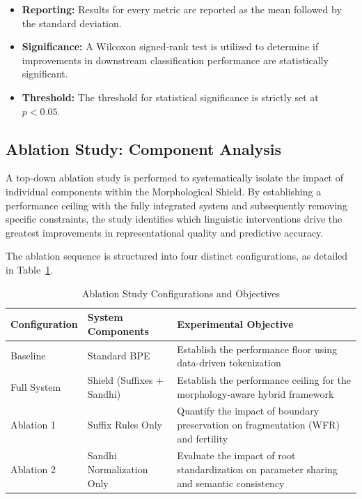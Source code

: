\documentclass[12pt]{article}
\begin{document}
\begin{itemize}
    \item \textbf{Reporting:} Results for every metric are reported as the mean followed by the standard deviation.
    
    \item \textbf{Significance:} A Wilcoxon signed-rank test is utilized to determine if improvements in downstream classification performance are statistically significant.
    
    \item \textbf{Threshold:} The threshold for statistical significance is strictly set at $p < 0.05$.
\end{itemize}

\subsection{Ablation Study: Component Analysis}

A top-down ablation study is performed to systematically isolate the impact of individual components within the Morphological Shield. By establishing a performance ceiling with the fully integrated system and subsequently removing specific constraints, the study identifies which linguistic interventions drive the greatest improvements in representational quality and predictive accuracy.

The ablation sequence is structured into four distinct configurations, as detailed in Table~\ref{tab:ablation}.

\begin{table}[H]
\centering
\renewcommand{\arraystretch}{1.3}
\begin{tabularx}{\textwidth}{>{\raggedright\arraybackslash}l >{\raggedright\arraybackslash}X >{\raggedright\arraybackslash}X}
\toprule
\textbf{Configuration} & \textbf{System Components} & \textbf{Experimental Objective} \\
\midrule

Baseline 
& Standard BPE 
& Establish the performance floor using data-driven tokenization \\

Full System 
& Shield (Suffixes + Sandhi) 
& Establish the performance ceiling for the morphology-aware hybrid framework \\

Ablation 1 
& Suffix Rules Only 
& Quantify the impact of boundary preservation on fragmentation (WFR) and fertility \\

Ablation 2 
& Sandhi Normalization Only 
& Evaluate the impact of root standardization on parameter sharing and semantic consistency \\

\bottomrule
\end{tabularx}
\caption{Ablation Study Configurations and Objectives}
\label{tab:ablation}
\end{table}
\end{document}
